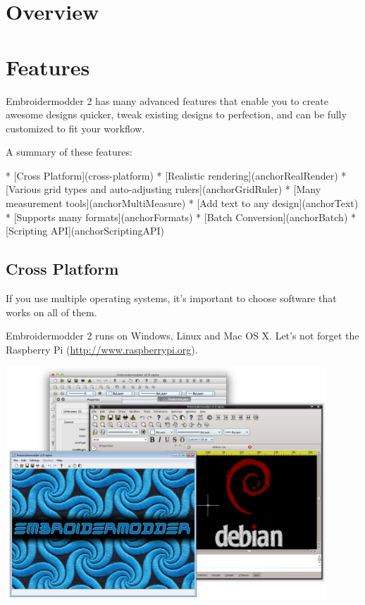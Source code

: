 \documentclass[a4paper, 11pt]{report}
\begin{document}
\section{Overview}

\section{Features}

Embroidermodder 2 has many advanced features that enable you to create awesome designs quicker, tweak existing designs to perfection, and can be fully customized to fit your workflow.

A summary of these features:

* [Cross Platform](cross-platform)
* [Realistic rendering](anchorRealRender)
* [Various grid types and auto-adjusting rulers](anchorGridRuler)
* [Many measurement tools](anchorMultiMeasure)
* [Add text to any design](anchorText)
* [Supports many formats](anchorFormats)
* [Batch Conversion](anchorBatch)
* [Scripting API](anchorScriptingAPI)

\subsection{Cross Platform}

If you use multiple operating systems, it's important to choose software that works on all of them.

Embroidermodder 2 runs on Windows, Linux and Mac OS X. Let's not forget the Raspberry Pi (\url{http://www.raspberrypi.org}).

\begin{center}
\includegraphics[width=0.9\textwidth]{images/features-platforms-1.png}
\end{center}
\end{document}
